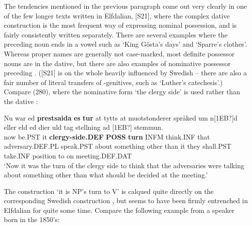 
The tendencies mentioned in the previous paragraph come out very clearly in one of the few longer texts written in Elfdalian, [S21], where the complex dative construction is the most frequent way of expressing nominal possession, and  is fairly consistently written separately. There are several examples where the preceding noun ends in a vowel such as  ‘King Gösta’s days’ and  ‘Sparre’s clothes’. Whereas proper names are generally not case-marked, most definite possessor nouns are in the dative, but there are also examples of nominative possessor preceding . ([S21] is on the whole heavily influenced by Swedish – there are also a fair number of literal transfers of -genitives, such as ‘Luther’s catechesis’.) Compare (280), where the nominative form  ‘the clergy side’ is used rather than the dative :


\ea\label{}
\gll Nu  war  ed  \textbf{prestsaida} \textbf{es} \textbf{tur} at  tytts at  muotstonderer  språked  um  n[1EB?]d  eller  eld  ed dier  uld  tag  stellning  ad  [1EB?]  stemmun.\\
now  be.PST  it  \textbf{clergy-side.DEF} \textbf{POSS} \textbf{turn} INFM  think.INF that  adversary.DEF.PL  speak.PST  about  something  other  than  it they  shall.PST  take.INF  position  to  on  meeting.DEF.DAT\\
\glt ‘Now it was the turn of the clergy side to think that the adversaries were talking about something other than what should be decided at the meeting.’ 
\z

The construction  ‘it is NP’s turn to V’ is calqued quite directly on the corresponding Swedish construction , but seems to have been firmly entrenched in Elfdalian for quite some time. Compare the following example from a speaker born in the 1850’s:

